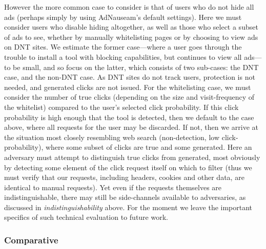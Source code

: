 \documentclass[conference]{IEEEtran}
\begin{document}
However the more common case to consider is that of users who do not hide all ads (perhaps simply by using AdNauseam's default settings). Here we must consider users who disable hiding altogether, as well as those who select a subset of ads to see, whether by manually whitelisting pages or by choosing to view ads on DNT sites. We estimate the former case---where a user goes through the trouble to install a tool with blocking capabilities, but continues to view all ads---to be small, and so focus on the latter, which consists of two sub-cases: the DNT case, and the non-DNT case. As DNT sites do not track users, protection is not needed, and generated clicks are not issued. For the whitelisting case, we must consider the number of true clicks (depending on the size and visit-frequency of the whitelist) compared to the user's selected click probability.  If this click probability is high enough that the tool is detected, then we default to the case above, where all requests for the user may be discarded. If not, then we arrive at the situation most closely resembling web search (non-detection, low click-probability), where some subset of clicks are true and some generated. Here an adversary must attempt to distinguish true clicks from generated, most obviously by detecting some element of the click request itself on which to filter (thus we must verify that our requests, including headers, cookies and other data, are identical to manual requests). Yet even if the requests themselves are indistinguishable, there may still be side-channels available to adversaries, as discussed in \emph{indistinguishability} above. For the moment we leave the important specifics of such technical evaluation to future work.


\subsubsection{Comparative}
\end{document}

